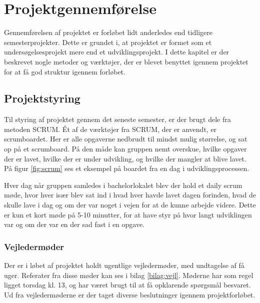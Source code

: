 \thispagestyle{fancy}
\chapter{Projektgennemførelse}
\label{chp:projektgennemforsel}

Gennemførelsen af projektet er forløbet lidt anderledes end tidligere semesterprojekter. Dette er grundet i, at projektet er formet som et undersøgelsesprojekt mere end et udviklingsprojekt. I dette kapitel er der beskrevet nogle metoder og værktøjer, der er blevet benyttet igennem projektet for at få god struktur igennem forløbet.

\section{Projektstyring}
\label{sec:projektstyring}

Til styring af projektet gennem det seneste semester, er der brugt dele fra metoden SCRUM.
Ét af de værktøjer fra SCRUM, der er anvendt, er scrumboardet. Her er alle opgaverne nedbrudt til mindst mulig størrelse, og sat op på et scrumboard. På den måde kan gruppen nemt overskue, hvilke opgaver der er lavet, hvilke der er under udvikling, og hvilke der mangler at blive lavet. På figur \ref{fig:scrum} ses et eksempel på boardet fra en dag i udviklingsprocessen. 


Hver dag når gruppen samledes i bachelorlokalet blev der hold et daily scrum møde, hvor hver især blev sat ind i hvad hver havde lavet dagen forinden, hvad de skulle lave i dag og om der var noget i vejen for at de kunne arbejde videre. Dette er kun et kort møde på 5-10 minutter, for at have styr på hvor langt udviklingen var og om der var en der sad fast i en opgave.

\subsection{Vejledermøder}
Der er i løbet af projektet holdt ugentlige vejledermøder, med undtagelse af få uger. Referater fra disse møder kan ses i bilag \ref{bilag:vejl}. Møderne har som regel ligget torsdag kl. 13, og har været brugt til at få opklarende spørgsmål besvaret. Ud fra vejledermøderne er der taget diverse beslutninger igennem projektforløbet.

